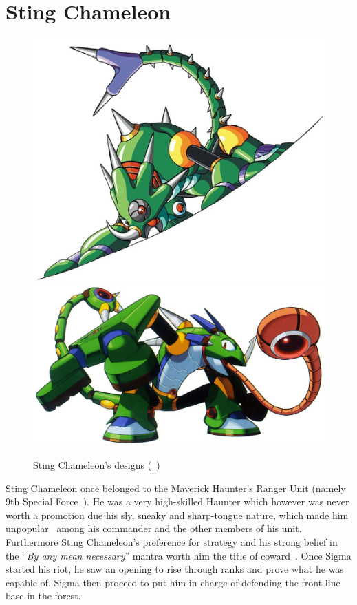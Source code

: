 \section{Sting Chameleon}\label{boss:Sting_chameleon}
\begin{figure}[htp]
	\centering
	\includegraphics[width=0.5\linewidth]{figures/X1/Sting_chameleon/Stingchameleon.jpg}
	\includegraphics[width=0.45\linewidth]{figures/X1/Sting_chameleon/MHXStingChameleon.jpg}
	\caption{Sting Chameleon's designs (~\cite{book:MMX_Complete_art})}
\end{figure}
Sting Chameleon once belonged to the Maverick Haunter's Ranger Unit (namely 9th Special Force~\cite{wayback:X_resources}). He was a very high-skilled Haunter which however was never worth a promotion due his sly, sneaky and sharp-tongue nature, which made him unpopular~\cite{Xcoll1:Manual_X1} among his commander and the other members of his unit. Furthermore Sting Chameleon's preference for strategy and his strong belief in the ``\textit{By any mean necessary}'' mantra  worth him the title of coward~\cite{MHX:manual}. Once Sigma started his riot, he saw an opening to rise through ranks and prove what he was capable of. Sigma then proceed to put him in charge of defending the front-line base in the forest.

